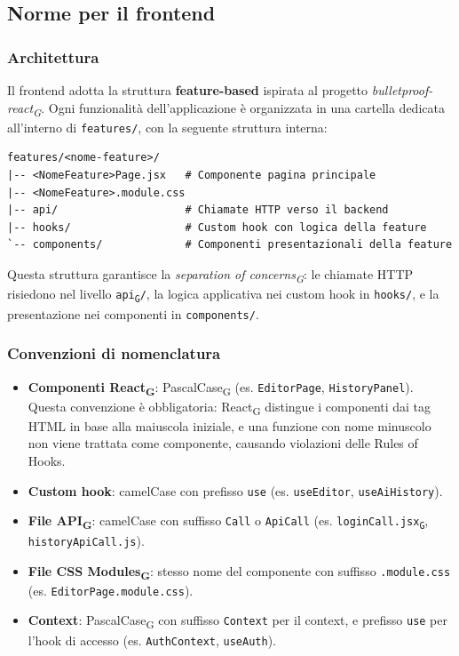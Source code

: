 \documentclass[11pt,a4paper]{article}
\newcommand{\gls}[1]{#1\textsubscript{G}}
\begin{document}
\subsection{Norme per il frontend}
\subsubsection{Architettura}
 
Il frontend adotta la struttura \textbf{feature-based} ispirata al progetto \textit{bulletproof-\gls{react}}. Ogni funzionalità dell'applicazione è organizzata in una cartella dedicata all'interno di \texttt{features/}, con la seguente struttura interna:
 
\begin{verbatim}
features/<nome-feature>/
|-- <NomeFeature>Page.jsx   # Componente pagina principale
|-- <NomeFeature>.module.css
|-- api/                    # Chiamate HTTP verso il backend
|-- hooks/                  # Custom hook con logica della feature
`-- components/             # Componenti presentazionali della feature
\end{verbatim}
 
Questa struttura garantisce la \textit{\gls{separation of concerns}}: le chiamate HTTP risiedono nel livello \texttt{\gls{api}/}, la logica applicativa nei custom hook in \texttt{hooks/}, e la presentazione nei componenti in \texttt{components/}.

\subsubsection{Convenzioni di nomenclatura}
\begin{itemize}
    \item \textbf{Componenti \gls{React}}: \gls{PascalCase} (es. \texttt{EditorPage}, \texttt{HistoryPanel}). Questa convenzione è obbligatoria: \gls{React} distingue i componenti dai tag HTML in base alla maiuscola iniziale, e una funzione con nome minuscolo non viene trattata come componente, causando violazioni delle Rules of Hooks.
    \item \textbf{Custom hook}: camelCase con prefisso \texttt{use} (es. \texttt{useEditor}, \texttt{useAiHistory}).
    \item \textbf{File \gls{API}}: camelCase con suffisso \texttt{Call} o \texttt{ApiCall} (es. \texttt{loginCall.\gls{jsx}}, \texttt{historyApiCall.js}).
    \item \textbf{File \gls{CSS Modules}}: stesso nome del componente con suffisso \texttt{.module.css} \\ (es. \texttt{EditorPage.module.css}).
    \item \textbf{Context}: \gls{PascalCase} con suffisso \texttt{Context} per il context, e prefisso \texttt{use} per l'hook di accesso (es. \texttt{AuthContext}, \texttt{useAuth}).
\end{itemize}
\end{document}
